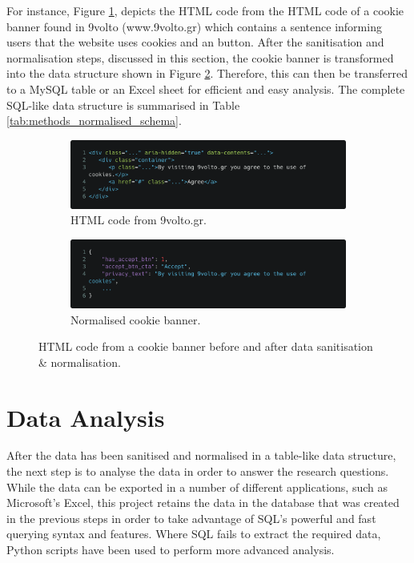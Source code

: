 \documentclass[../main.tex]{subfiles}
\begin{document}
For instance, Figure \ref{fig:methods_code}, depicts the HTML code from the HTML code of a cookie banner found in 9volto (www.9volto.gr) which contains a sentence informing users that the website uses cookies and an  button. After the sanitisation and normalisation steps, discussed in this section, the cookie banner is transformed into the data structure shown in Figure \ref{fig:methods_code_normalised}. Therefore, this can then be transferred to a MySQL table or an Excel sheet for efficient and easy analysis. The complete SQL-like data structure is summarised in Table \ref{tab:methods_normalised_schema}.

\begin{figure}[ht]
    \centering
    \begin{subfigure}[b]{0.49\textwidth}
        \centering
        \includegraphics[width=\textwidth]{images/methodology/code.png}
        \caption{HTML code from 9volto.gr.}
        \label{fig:methods_code}
    \end{subfigure}
    \hfill
    \begin{subfigure}[b]{0.49\textwidth}
        \centering
        \includegraphics[width=\textwidth]{images/methodology/normalised.png}
        \caption{Normalised cookie banner.}
        \label{fig:methods_code_normalised}
    \end{subfigure}
    \caption{HTML code from a cookie banner before and after data sanitisation \& normalisation.}
    \label{fig:methods_html_code}
\end{figure}


\section{Data Analysis}
\label{sec:methodology_analysing_data}
After the data has been sanitised and normalised in a table-like data structure, the next step is to analyse the data in order to answer the research questions. While the data can be exported in a number of different applications, such as Microsoft’s Excel, this project retains the data in the database that was created in the previous steps in order to take advantage of SQL’s powerful and fast querying syntax and features. Where SQL fails to extract the required data, Python scripts have been used to perform more advanced analysis.
   
\end{document}
